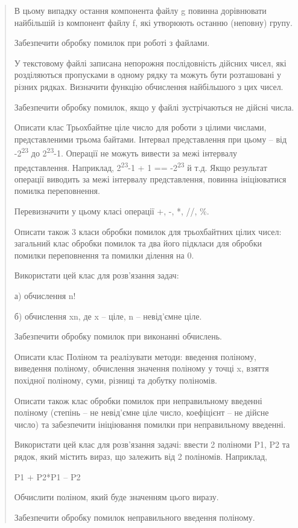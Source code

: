 \documentclass[]{article}
\begin{document}
\begin{quote}
В цьому випадку остання компонента файлу g повинна дорівнювати
найбільшій із компонент файлу f, які утворюють останню (неповну) групу.

Забезпечити обробку помилок при роботі з файлами.

У текстовому файлі записана непорожня послідовність дійсних чисел, які
розділяються пропусками в одному рядку та можуть бути розташовані у
різних рядках. Визначити функцію обчислення найбільшого з цих чисел.

Забезпечити обробку помилок, якщо у файлі зустрічаються не дійсні числа.

Описати клас Трьохбайтне ціле число для роботи з цілими числами,
представленими трьома байтами. Інтервал представлення при цьому -- від
-2\textsuperscript{23} до 2\textsuperscript{23}-1. Операції не можуть
вивести за межі інтервалу представлення. Наприклад,
2\textsuperscript{23}-1 + 1 == -2\textsuperscript{23} й т.д. Якщо
результат операції виводить за межі інтервалу представлення, повинна
ініціюватися помилка переповнення.

Перевизначити у цьому класі операції +, -, *, //, \%.

Описати також 3 класи обробки помилок для трьохбайтних цілих чисел:
загальний клас обробки помилок та два його підкласи для обробки помилки
переповнення та помилки ділення на 0.

Використати цей клас для розв'язання задач:

а) обчислення n!

б) обчислення xn, де x -- ціле, n -- невід'ємне ціле.

Забезпечити обробку помилок при виконанні обчислень.

Описати клас Поліном та реалізувати методи: введення поліному, виведення
поліному, обчислення значення поліному у точці x, взяття похідної
поліному, суми, різниці та добутку поліномів.

Описати також клас обробки помилок при неправильному введенні поліному
(степінь -- не невід'ємне ціле число, коефіцієнт -- не дійсне число) та
забезпечити ініціювання помилки при неправильному введенні.

Використати цей клас для розв'язання задачі: ввести 2 поліноми P1, P2 та
рядок, який містить вираз, що залежить від 2 поліномів. Наприклад,

P1 + P2*P1 -- P2

Обчислити поліном, який буде значенням цього виразу.

Забезпечити обробку помилок неправильного введення поліному.


\end{quote}
\end{document}
